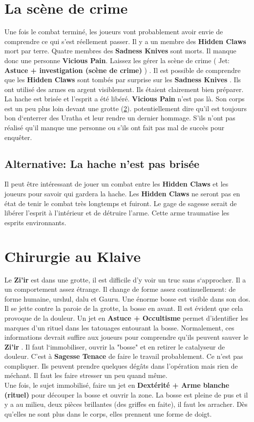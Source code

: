 \documentclass[oneside,12pt]{book}
\newcommand\roll[1]{
( Jet: \textbf{#1})
}
\newcommand{\Jessica}{\textbf{Sagesse Tenace} }
\newcommand{\Thomas}{\textbf{Zi'ir} }
\newcommand{\Sadness}{\textbf{Sadness Knives} }
\newcommand{\Hidden}{\textbf{Hidden Claws} }
\begin{document}
\begin{flushleft}
\section{La scène de crime}
Une fois le combat terminé, les joueurs vont probablement avoir envie de comprendre ce qui s'est réellement passer. Il y a un membre des \Hidden mort par terre. Quatre membres des \Sadness sont morts. Il manque donc une personne \textbf{Vicious Pain}. 
Laissez les gérer la scène de crime \roll{Astuce + investigation (scène de crime) }. Il est possible de comprendre que les \Hidden sont tombés par surprise sur les \Sadness. Ils ont utilisé des armes en argent visiblement. Ils étaient clairement bien préparer. La hache est brisée et l'esprit a été libéré. \textbf{Vicious Pain} n'est pas là. Son corps est un peu plus loin devant une grotte (\ref{chirurgie}). potentiellement dire qu'il est toujours bon d`enterrer des Uratha et leur rendre un dernier hommage. S'ils n'ont pas réalisé qu'il manque une personne ou s'ils ont fait pas mal de succès pour enquêter. 

\subsection{Alternative: La hache n'est pas brisée}
Il peut être intéressant de jouer un combat entre les \Hidden et les joueurs pour savoir qui gardera la hache. Les \Hidden ne seront pas en état de tenir le combat très longtemps et fuiront. Le gage de sagesse serait de libérer l'esprit à l'intérieur et de détruire l'arme. Cette arme traumatise les esprits environnants.

\section{Chirurgie au Klaive}
\label{chirurgie}
Le \Thomas est dans une grotte, il est difficile d'y voir un truc sans s`approcher. Il a un comportement assez étrange. Il change de forme assez continuellement: de forme humaine, urshul, dalu et Gauru. Une énorme bosse est visible dans son dos. Il se jette contre la paroie de la grotte, la bosse en avant. Il est évident que cela provoque de la douleur.   Un jet en \textbf{Astuce + Occultisme} permet d'identifier les marques d'un rituel dans les tatouages entourant la bosse.
Normalement, ces informations devrait suffire aux joueurs pour comprendre qu'ils peuvent sauver le \Thomas. Il faut l`immobiliser, ouvrir la "bosse" et en retirer le catalyseur de douleur. C'est à \Jessica de faire le travail probablement.
Ce n'est pas compliquer. Ils peuvent prendre quelques dégâts dans l'opération mais rien de méchant. Il faut les faire stresser un peu quand même. \\
Une fois, le sujet immobilisé, faire un jet en \textbf{Dextérité + Arme blanche (rituel)} pour découper la bosse et ouvrir la zone. La bosse est pleine de pus et il y a au milieu, deux pièces brillantes (des griffes en faite), il faut les arracher. Dès qu'elles ne sont plus dans le corps, elles prennent une forme de doigt.


\end{flushleft}
\end{document}
